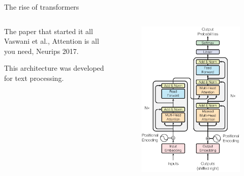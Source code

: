 \documentclass[xcolor=pdftex,dvipsnames,table,mathserif]{beamer}
\begin{document}
\begin{frame}{The rise of transformers}

  \begin{columns}

    \begin{column}{.5\textwidth}
      \begin{block}{The paper that started it all}
        Vaswani et al., Attention is all you need, Neurips 2017.
      \end{block}
      This architecture was developed for text processing.\\

    \end{column}

    \begin{column}{.5\textwidth}
      \begin{figure}[ht]
        \centering
        \includegraphics[width=\textwidth]{transformer}
      \end{figure}
    \end{column}

  \end{columns}


\end{frame}
\end{document}
